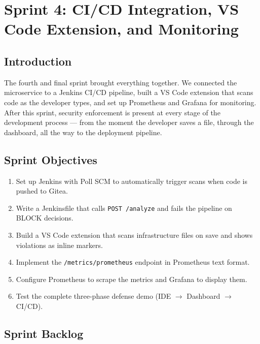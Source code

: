 
\chapter{Sprint 4: CI/CD Integration, VS Code Extension, and Monitoring}
\label{chap:sprint4}

\section{Introduction}

The fourth and final sprint brought everything together. We connected the microservice to a Jenkins CI/CD pipeline, built a VS Code extension that scans code as the developer types, and set up Prometheus and Grafana for monitoring. After this sprint, security enforcement is present at every stage of the development process --- from the moment the developer saves a file, through the dashboard, all the way to the deployment pipeline.


\section{Sprint Objectives}

\begin{enumerate}[leftmargin=1.5cm]
  \item Set up Jenkins with Poll SCM to automatically trigger scans when code is pushed to Gitea.
  \item Write a Jenkinsfile that calls \texttt{POST /analyze} and fails the pipeline on BLOCK decisions.
  \item Build a VS Code extension that scans infrastructure files on save and shows violations as inline markers.
  \item Implement the \texttt{/metrics/prometheus} endpoint in Prometheus text format.
  \item Configure Prometheus to scrape the metrics and Grafana to display them.
  \item Test the complete three-phase defense demo (IDE $\rightarrow$ Dashboard $\rightarrow$ CI/CD).
\end{enumerate}


\section{Sprint Backlog}

